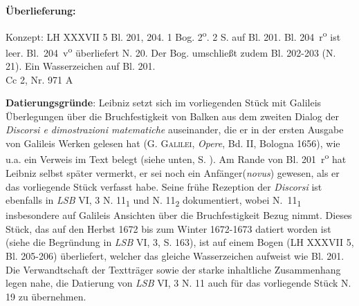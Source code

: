 \begin{ledgroupsized}[r]{120mm}
\footnotesize 
\pstart 
\noindent\textbf{\"{U}berlieferung:}
\pend
\end{ledgroupsized} 
\begin{ledgroupsized}[r]{114mm}
\footnotesize 
\pstart \parindent -6mm
Konzept: LH XXXVII 5 Bl. 201, 204. 1 Bog. 2\textsuperscript{o}. 2 S. auf Bl. 201. Bl. 204~r\textsuperscript{o} ist leer. Bl.~204~v\textsuperscript{o} überliefert N. 20. %
Der Bog. umschließt zudem Bl. 202-203 (N. 21). %
Ein Wasserzeichen auf Bl. 201.\\
Cc 2, Nr. 971 A
\pend
\end{ledgroupsized}
%
\vspace{4mm}
\begin{ledgroup}
\footnotesize 
\pstart
\noindent\footnotesize{\textbf{Datierungsgr\"{u}nde}: Leibniz setzt sich im vorliegenden Stück mit Galileis Überlegungen über die Bruch\-festigkeit von Balken aus dem zweiten Dialog der \textit{Discorsi e dimostrazioni matematiche} auseinander, die er in der ersten Ausgabe von Galileis Werken gelesen hat (\cite{01084}G. \textsc{Galilei}, \textit{Opere}, Bd. II, Bologna 1656), wie u.a. ein Verweis im Text belegt (siehe unten, S. ). Am Rande von Bl. 201~r\textsuperscript{o} hat Leibniz selbst später vermerkt, er sei noch \glqq ein Anfänger\grqq(\textit{novus}) gewesen, als er das vorliegende Stück verfasst habe. Seine frühe Rezeption der \textit{Discorsi} ist ebenfalls in \cite{00260}\textit{LSB} VI, 3 N. 11\textsubscript{1} und N. 11\textsubscript{2} dokumentiert, wobei N.~11\textsubscript{1} insbesondere auf Galileis Ansichten über die Bruchfestigkeit Bezug nimmt. Dieses Stück, das auf den Herbst 1672 bis zum Winter 1672-1673 datiert worden ist (siehe die Begründung in \textit{LSB} VI, 3, S. 163), ist auf einem Bogen (LH XXXVII 5, Bl. 205-206) überliefert, welcher das gleiche Wasserzeichen aufweist wie Bl. 201. Die Verwandtschaft der Textträger sowie der starke inhaltliche Zusammenhang legen nahe, die Datierung von \cite{00260}\textit{LSB} VI, 3 N. 11 auch für das vorliegende Stück N. 19 %
zu übernehmen.}
\pend
\end{ledgroup}
%
\vspace{4mm}
\count{}
\count{}
\count{}
\pstart
\noindent
[201~r\textsuperscript{o}]
\pend
\pstart 
\normalsize
\noindent
\centering
{}
